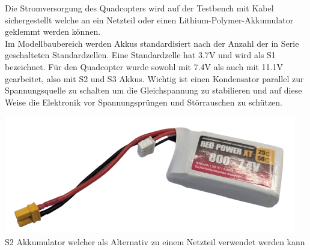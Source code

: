 \begin{center} 
\end{center}
Die Stromversorgung des Quadcopters wird auf der Testbench mit Kabel sichergestellt welche an ein Netzteil oder einen Lithium-Polymer-Akkumulator geklemmt werden können.\\
Im Modellbaubereich werden Akkus standardisiert nach der Anzahl der in Serie geschalteten Standardzellen. Eine Standardzelle hat 3.7V und wird als S1 bezeichnet. Für den Quadcopter wurde sowohl mit 7.4V als auch mit 11.1V gearbeitet, also mit S2 und S3 Akkus. Wichtig ist einen Kondensator parallel zur Spannungsquelle zu schalten um die Gleichspannung zu stabilieren und auf diese Weise die Elektronik vor Spannungsprüngen und Störrauschen zu 
schützen.
\begin{center}
	\includegraphics[scale=0.42]{../images/0082 Akku.png}{\\\label{Akku}S2 Akkumulator welcher als Alternativ zu einem Netzteil verwendet werden kann}
\end{center}
